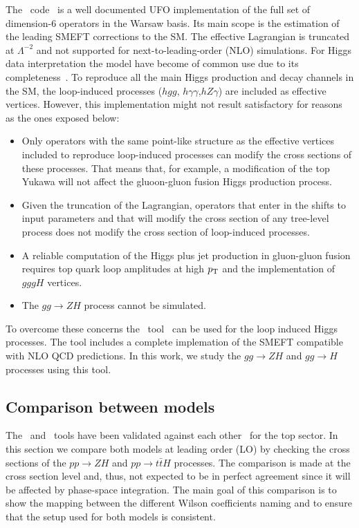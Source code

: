 The \SMEFTsim\ code~\cite{Brivio:2017btx} is a well documented UFO implementation of the full set of dimension-6 operators in the Warsaw basis. Its main scope is the estimation of the leading SMEFT corrections to the SM. The effective Lagrangian is truncated at $\Lambda^{-2}$ and not supported for next-to-leading-order (NLO) simulations. For Higgs data interpretation the model have become of common use due to its completeness~\cite{Ellis:2018gqa,ATLAS:2019jst}.  To reproduce all the main Higgs production and decay channels in the SM, the loop-induced processes ($hgg$, $h\gamma\gamma$,$hZ\gamma$) are included as effective vertices. However, this implementation might not result satisfactory for reasons as the ones exposed below:
\begin{itemize}
\item Only operators with the same point-like structure as the effective vertices included to reproduce loop-induced processes can modify the cross sections of these processes. That means that, for example, a modification of the top Yukawa will not affect the gluoon-gluon fusion Higgs production process.
\item Given the truncation of the Lagrangian, operators that enter in the shifts to input parameters and that will modify the cross section of any tree-level process does not modify the cross section of loop-induced processes.
\item A reliable computation of the Higgs plus jet  production in gluon-gluon fusion requires top quark loop amplitudes at high $p_{\textrm T}$ and the implementation of $gggH$ vertices.
\item The $gg\to ZH$ process cannot be simulated.
\end{itemize}

To overcome these concerns the \SMEFTatNLO\ tool~\cite{SMEFTNLO} can be used for the loop induced Higgs processes. The tool includes a complete implemation of the SMEFT compatible with NLO QCD predictions. In this work, we study the $gg\to ZH$ and $gg\to H$ processes using this tool. 







\subsection{Comparison between models}
\label{sec:higgseft:section2}
The \SMEFTsim\ and \SMEFTatNLO\ tools have been validated against each other~\cite{Durieux:2019lnv} for the top sector. In this section we compare both models at leading order (LO) by checking the cross sections of the $pp\to ZH$ and $pp\to t\bar{t}H$ processes. The comparison is made at the cross section level and, thus, not expected to be in perfect agreement since it will be affected by phase-space integration. The main goal of this comparison is to show the mapping between the different Wilson coefficients naming and to ensure that the setup used for both models is consistent.

